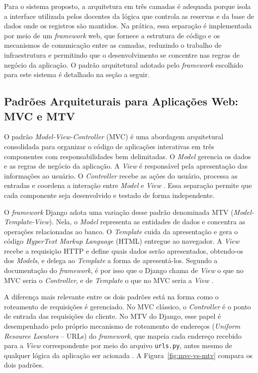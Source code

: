 Para o sistema proposto, a arquitetura em três camadas é adequada porque isola a interface utilizada pelos docentes da lógica que controla as reservas e da base de dados onde os registros são mantidos. Na prática, essa separação é implementada por meio de um \textit{framework} web, que fornece a estrutura de código e os mecanismos de comunicação entre as camadas, reduzindo o trabalho de infraestrutura e permitindo que o desenvolvimento se concentre nas regras de negócio da aplicação. O padrão arquitetural adotado pelo \textit{framework} escolhido para este sistema é detalhado na seção a seguir.

\subsection{Padrões Arquiteturais para Aplicações Web: MVC e MTV}
\label{sec:mvc_mtv}

O padrão \textit{Model-View-Controller} (MVC) é uma abordagem arquitetural consolidada para organizar o código de aplicações interativas em três componentes com responsabilidades bem delimitadas. O \textit{Model} gerencia os dados e as regras de negócio da aplicação. A \textit{View} é responsável pela apresentação das informações ao usuário. O \textit{Controller} recebe as ações do usuário, processa as entradas e coordena a interação entre \textit{Model} e \textit{View} \cite{sommerville2018}. Essa separação permite que cada componente seja desenvolvido e testado de forma independente.

O \textit{framework} Django adota uma variação desse padrão denominada MTV (\textit{Model-Template-View}). Nela, o \textit{Model} representa as entidades de dados e concentra as operações relacionadas ao banco. O \textit{Template} cuida da apresentação e gera o código \textit{HyperText Markup Language} (HTML) entregue ao navegador. A \textit{View} recebe a requisição HTTP e define quais dados serão apresentados, obtendo-os dos \textit{Models}, e delega ao \textit{Template} a forma de apresentá-los. Segundo a documentação do \textit{framework}, é por isso que o Django chama de \textit{View} o que no MVC seria o \textit{Controller}, e de \textit{Template} o que no MVC seria a \textit{View} \cite{djangofaq}.

A diferença mais relevante entre os dois padrões está na forma como o roteamento de requisições é gerenciado. No MVC clássico, o \textit{Controller} é o ponto de entrada das requisições do cliente. No MTV do Django, esse papel é desempenhado pelo próprio mecanismo de roteamento de endereços (\textit{Uniform Resource Locators} -- URLs) do \textit{framework}, que mapeia cada endereço recebido para a \textit{View} correspondente por meio do arquivo \texttt{urls.py}, antes mesmo de qualquer lógica da aplicação ser acionada \cite{djangofaq,djangodocs}. A Figura~\ref{fig:mvc-vs-mtv} compara os dois padrões.


